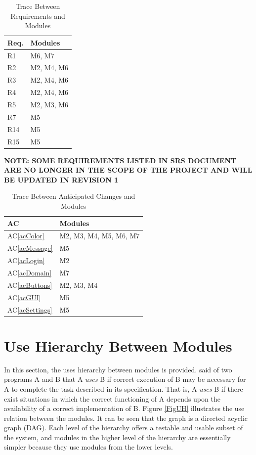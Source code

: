 \documentclass[12pt, titlepage]{article}
\newcommand{\acref}[1]{AC\ref{#1}}
\begin{document}
\begin{table}[H]
\centering
\begin{tabular}{p{} p{}}
\toprule
\textbf{Req.} & \textbf{Modules}\\
\midrule
R1 & M6, M7\\
R2 & M2, M4, M6\\
R3 & M2, M4, M6\\
R4 & M2, M4, M6\\
R5 & M2, M3, M6\\
R7 & M5\\
R14 & M5\\
R15 & M5\\
\bottomrule
\end{tabular}
\caption{Trace Between Requirements and Modules}
\label{TblRT}
\end{table}

\textbf{NOTE: SOME REQUIREMENTS LISTED IN SRS DOCUMENT ARE NO LONGER IN THE SCOPE OF THE PROJECT AND WILL BE UPDATED IN REVISION 1}

\begin{table}[H]
\centering
\begin{tabular}{p{} p{}}
\toprule
\textbf{AC} & \textbf{Modules}\\
\midrule
\acref{acColor} & M2, M3, M4, M5, M6, M7\\
\acref{acMessage} & M5\\
\acref{acLogin} & M2\\
\acref{acDomain} & M7\\
\acref{acButtons} & M2, M3, M4\\
\acref{acGUI} & M5\\
\acref{acSettings} & M5\\
\bottomrule
\end{tabular}
\caption{Trace Between Anticipated Changes and Modules}
\label{TblACT}
\end{table}

\section{Use Hierarchy Between Modules} \label{SecUse}

In this section, the uses hierarchy between modules is
provided. \citet{Parnas1978} said of two programs A and B that A {\em uses} B if
correct execution of B may be necessary for A to complete the task described in
its specification. That is, A {\em uses} B if there exist situations in which
the correct functioning of A depends upon the availability of a correct
implementation of B.  Figure \ref{FigUH} illustrates the use relation between
the modules. It can be seen that the graph is a directed acyclic graph
(DAG). Each level of the hierarchy offers a testable and usable subset of the
system, and modules in the higher level of the hierarchy are essentially simpler
because they use modules from the lower levels.
\end{document}
